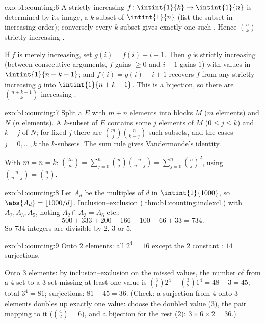 \begin{solution}{exo:b1:counting:6}
A strictly increasing  $f \colon \intint{1}{k} \to \intint{1}{n}$
is determined by its image, a $k$-subset of $\intint{1}{n}$ (list the
subset in increasing order); conversely every $k$-subset gives exactly
one such . Hence $\binom nk$ strictly increasing .

If $f$ is merely increasing, set $g(i) = f(i) + i - 1$. Then $g$ is
strictly increasing (between consecutive arguments, $f$ gains $\geq 0$
and $i - 1$ gains $1$) with values in $\intint{1}{n + k - 1}$; and
$f(i) = g(i) - i + 1$ recovers $f$ from any strictly increasing $g$
into $\intint{1}{n+k-1}$. This is a bijection, so there are
$\binom{n + k - 1}{k}$ increasing .
\end{solution}

\begin{solution}{exo:b1:counting:7}
Split a  $E$ with $m + n$ elements into blocks $M$ ($m$ elements)
and $N$ ($n$ elements). A $k$-subset of $E$ contains some $j$ elements
of $M$ ($0 \leq j \leq k$) and $k - j$ of $N$; for fixed $j$ there are
$\binom mj \binom{n}{k-j}$ such subsets, and the cases $j = 0, \dots,
k$  the $k$-subsets. The sum rule gives Vandermonde's
identity.

With $m = n = k$: $\binom{2n}{n} = \sum_{j=0}^{n} \binom nj
\binom{n}{n-j} = \sum_{j=0}^{n} \binom nj^2$, using $\binom{n}{n-j} =
\binom nj$.
\end{solution}

\begin{solution}{exo:b1:counting:8}
Let $A_d$ be the multiples of $d$ in $\intint{1}{1000}$, so
$\abs{A_d} = \lfloor 1000/d \rfloor$. Inclusion--exclusion
(\cref{thm:b1:counting:inclexcl}) with $A_2, A_3, A_5$, noting
$A_2 \cap A_3 = A_6$ etc.:
\[
500 + 333 + 200 - 166 - 100 - 66 + 33 = 734 .
\]
So $734$ integers are divisible by $2$, $3$ or $5$.
\end{solution}

\begin{solution}{exo:b1:counting:9}
Onto $2$ elements: all $2^4 = 16$  except the $2$ constant :
$14$ surjections.

Onto $3$ elements: by inclusion--exclusion on the missed values, the
number of  from a $4$-set to a $3$-set missing at least one value
is $\binom 31 2^4 - \binom 32 1^4 = 48 - 3 = 45$; total  $3^4 =
81$; surjections: $81 - 45 = 36$. (Check: a surjection from $4$ onto
$3$ elements doubles up exactly one value: choose the doubled value
($3$), the pair mapping to it ($\binom 42 = 6$), and a bijection for
the rest ($2$): $3 \times 6 \times 2 = 36$.)
\end{solution}

